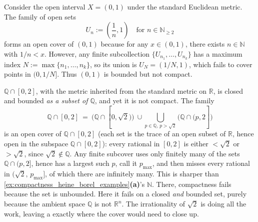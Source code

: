 \begin{aiexample}
Consider the open interval $X = (0,1)$ under the standard Euclidean metric. The family of open sets
\[
U_n := \left(\frac{1}{n}, 1\right) \quad \text{for } n \in \mathbb{N}_{\ge 2}
\]
forms an open cover of $(0,1)$ because for any $x \in (0,1)$, there exists $n \in \mathbb{N}$ with $1/n < x$. However, any finite subcollection $\{U_{n_1}, \dots, U_{n_k}\}$ has a maximum index $N := \max\{n_1, \dots, n_k\}$, so its union is $U_N = (1/N, 1)$, which fails to cover points in $(0, 1/N]$. Thus $(0,1)$ is bounded but not compact.
\end{aiexample}

\begin{example}
\label{ex:rationals_not_compact}
$\mathbb{Q} \cap [0,2]$, with the metric inherited from the standard metric on $\mathbb{R}$, is
closed and bounded \emph{as a subset of $\mathbb{Q}$}, and yet it is not compact. The family
\[\mathbb{Q}\cap[0,2] \ =\ \big(\mathbb{Q}\cap[0,\sqrt2)\big) \ \cup\!\!
  \bigcup_{p\in\mathbb{Q},\,p>\sqrt2}\!\big(\mathbb{Q}\cap(p,2]\big)\]
is an open cover of $\mathbb{Q}\cap[0,2]$ (each set is the trace of an open subset of
$\mathbb{R}$, hence open in the subspace $\mathbb{Q}\cap[0,2]$): every rational in $[0,2]$ is
either $<\sqrt2$ or $>\sqrt2$, since $\sqrt2 \notin \mathbb{Q}$. Any finite subcover uses only
finitely many of the sets $\mathbb{Q}\cap(p,2]$, hence has a largest such $p$, call it
$p_{\max}$, and then misses every rational in $(\sqrt2,\,p_{\max}]$, of which there are infinitely
many. This is sharper than \cref{ex:compactness_heine_borel_examples}\textbf{(a)}'s $\mathbb{N}$.
There, compactness fails because the set is unbounded. Here it fails on a closed \emph{and}
bounded set, purely because the ambient space $\mathbb{Q}$ is not $\mathbb{R}^n$. The
irrationality of $\sqrt2$ is doing all the work, leaving a  exactly where the cover would
need to close up.
\end{example}

